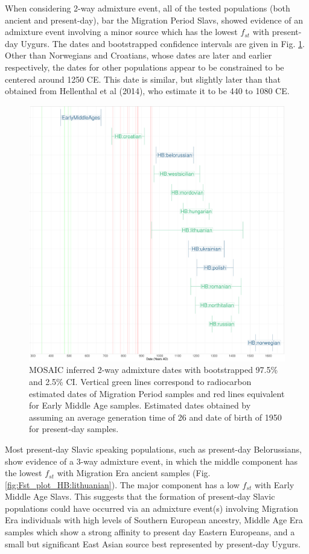 When considering 2-way admixture event, all of the tested populations (both ancient and present-day), bar the Migration Period Slavs, showed evidence of an admixture event involving a minor source which has the lowest $f_{st}$ with present-day Uygurs. The dates and bootstrapped confidence intervals are given in Fig. \ref{fig:MOSAIC_admixture_dates_plot}. Other than Norwegians and Croatians, whose dates are later and earlier respectively, the dates for other populations appear to be constrained to be centered around 1250 CE. This date is similar, but slightly later than that obtained from Hellenthal et al (2014), who estimate it to be 440 to 1080 CE. 

\begin{figure}[htp]
    \centering
    \includegraphics[width=1.0\textwidth]{../images/chapter5/MOSAIC_admixture_dates_plot.pdf}
    \caption{MOSAIC inferred 2-way admixture dates with bootstrapped 97.5\% and 2.5\% CI. Vertical green lines correspond to radiocarbon estimated dates of Migration Period samples and red lines equivalent for Early Middle Age samples. Estimated dates obtained by assuming an average generation time of 26 and date of birth of 1950 for present-day samples.}
    \label{fig:MOSAIC_admixture_dates_plot}
\end{figure} 

Most present-day Slavic speaking populations, such as present-day Belorussians, show evidence of a 3-way admixture event, in which the middle component has the lowest $f_{st}$ with Migration Era ancient samples (Fig. \ref{fig:Fst_plot_HB:lithuanian}). The major component has a low $f_{st}$ with Early Middle Age Slavs. This suggests that the formation of present-day Slavic populations could have occurred via an admixture event(s) involving Migration Era individuals with high levels of Southern European ancestry, Middle Age Era samples which show a strong affinity to present day Eastern Europeans, and a small but significant East Asian source best represented by present-day Uygurs. 

